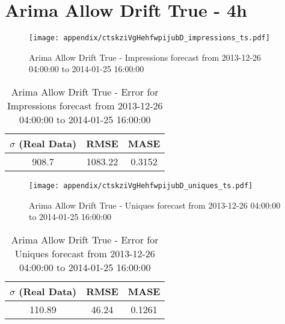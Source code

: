 \section{Arima Allow Drift True - 4h}
\begin{figure}[H] \begin{center} \leavevmode
\texttt{[image: appendix/ctskziVgHehfwpijubD\_impressions\_ts.pdf]} \caption{
Arima Allow Drift True - Impressions forecast from 2013-12-26 04:00:00 to 2014-01-25 16:00:00} \label{fig:appendix/ctskziVgHehfwpijubD_impressions_ts.pdf} \end{center}
\end{figure}

\begin{table}[H]
\centering
\footnotesize
\begin{tabular}{ccc}
$\sigma$ (Real Data) & RMSE & MASE   \\ \hline
908.7 & 1083.22 & 0.3152 \\
\end{tabular}

\vspace{0.5cm}

\caption{
Arima Allow Drift True - Error for Impressions forecast from 2013-12-26 04:00:00 to 2014-01-25 16:00:00}
\end{table}

\begin{figure}[H] \begin{center} \leavevmode
\texttt{[image: appendix/ctskziVgHehfwpijubD\_uniques\_ts.pdf]} \caption{
Arima Allow Drift True - Uniques forecast from 2013-12-26 04:00:00 to 2014-01-25 16:00:00} \label{fig:appendix/ctskziVgHehfwpijubD_uniques_ts.pdf} \end{center}
\end{figure}

\begin{table}[H]
\centering
\footnotesize
\begin{tabular}{ccc}
$\sigma$ (Real Data) & RMSE & MASE   \\ \hline
110.89 & 46.24 & 0.1261 \\
\end{tabular}

\vspace{0.5cm}

\caption{
Arima Allow Drift True - Error for Uniques forecast from 2013-12-26 04:00:00 to 2014-01-25 16:00:00}
\end{table}

